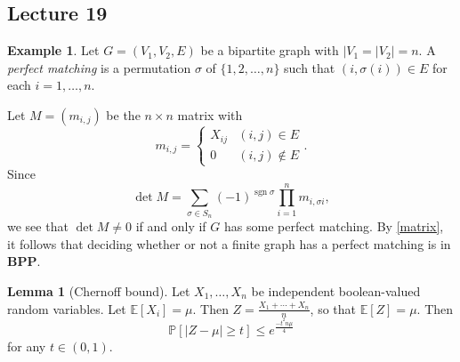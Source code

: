 \documentclass[10pt,letterpaper,cm]{nupset}
\theoremstyle{definition}
\newtheorem{exmp}[definition]{Example}
\theoremstyle{theorem}
\newtheorem{lemma}[definition]{Lemma}
\theoremstyle{remark}
\newcommand{\1}{\mathbf{1}}
\newcommand{\0}{\vec 0}
\DeclareMathOperator{\sgn}{sgn}
\begin{document}
\subsection{Lecture 19}

\begin{exmp}
Let $G=(V_1, V_2, E)$ be a bipartite graph with $|V_1=|V_2|=n$. 
A \textit{perfect matching} is a permutation $\sigma$ of $\{1,2, \ldots, n\}$ such that $(i, \sigma(i)) \in E$ for each $i=1, \ldots, n$.

Let $M= (m_{i,j})$ be the $n\times n$ matrix with $$m_{i,j} = \begin{cases} X_{ij} & (i,j) \in E\\ 0 & (i,j) \notin E    \end{cases}.$$ Since $$\det{M} =  \sum_{\sigma \in S_n} ({-}1)^{\sgn{\sigma}} \prod_{i=1}^n m_{i, \sigma{i}} ,$$ we see that $\det{M} \ne 0$ if and only if $G$ has some perfect matching. By \cref{matrix}, it follows that deciding whether or not a finite graph has a perfect matching is in $\mathbf{BPP}$.
\end{exmp}

\begin{lemma}[Chernoff bound]
Let $X_1, \ldots, X_n$ be independent boolean-valued random variables. Let $\mathbb{E}[X_i]= \mu$. Then $Z= \frac{X_1 + \cdots + X_n}{n}$, so that $\mathbb{E}[Z] = \mu$. Then $$\mathbb{P}[\lvert{Z - \mu}\rvert \geq t] \leq e^{\frac{{-t^2n} \mu}{4}}$$ for any $t\in (0,1)$.
\end{lemma}
\end{document}
